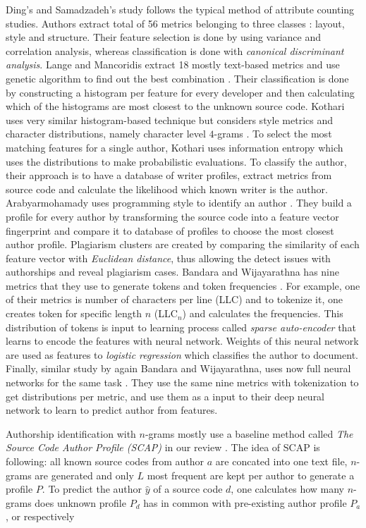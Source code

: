Ding's and Samadzadeh's study follows the typical method of attribute counting studies. Authors extract total of 56 metrics belonging to three classes \cite{EJPFSAI2004}: layout, style and structure. Their feature selection is done by using variance and correlation analysis, whereas classification is done with \emph{canonical discriminant analysis}. Lange and Mancoridis extract 18 mostly text-based metrics and use genetic algorithm to find out the best combination \cite{UCMHGAAI2007}. Their classification is done by constructing a histogram per feature for every developer and then calculating which of the histograms are most closest to the unknown source code. Kothari \etal uses very similar histogram-based technique but considers style metrics and character distributions, namely character level $4$-grams \cite{APASCAI2007}. To select the most matching features for a single author, Kothari \etal uses information entropy which uses the distributions to make probabilistic evaluations. To classify the author, their approach is to have a database of writer profiles, extract metrics from source code and calculate the likelihood which known writer is the author. Arabyarmohamady \etal uses programming style to identify an author \cite{ACSBPD2012}. They build a profile for every author by transforming the source code into a feature vector \ie fingerprint and compare it to database of profiles to choose the most closest author profile. Plagiarism clusters are created by comparing the similarity of each feature vector with \emph{Euclidean distance}, thus allowing the detect issues with authorships and reveal plagiarism cases. Bandara and Wijayarathna has nine metrics that they use to generate tokens and token frequencies \cite{SCAIUFL2013}. For example, one of their metrics is number of characters per line (LLC) and to tokenize it, one creates token for specific length $n$ (LLC$_n$) and calculates the frequencies. This distribution of tokens is input to learning process called \emph{sparse auto-encoder} that learns to encode the features with neural network. Weights of this neural network are used as features to \emph{logistic regression} which classifies the author to document. Finally, similar study by again Bandara and Wijayarathna, uses now full neural networks for the same task \cite{DNNSCAI2013}. They use the same nine metrics with tokenization to get distributions per metric, and use them as a input to their deep neural network to learn to predict author from features.

Authorship identification with $n$-grams mostly use a baseline method called \emph{The Source Code Author Profile (SCAP)} in our review \cite{ESHPFSCAC2008, TSUDIJSCAI2011, CAPSCAP2014, ABEC2014}. The idea of SCAP is following: all known source codes from author $a$ are concated into one text file, $n$-grams are generated and only $L$ most frequent are kept per author to generate a profile $P$. To predict the author $\hat{y}$ of a source code $d$, one calculates how many $n$-grams does unknown profile $P_d$ has in common with pre-existing author profile $P_a$, or respectively

